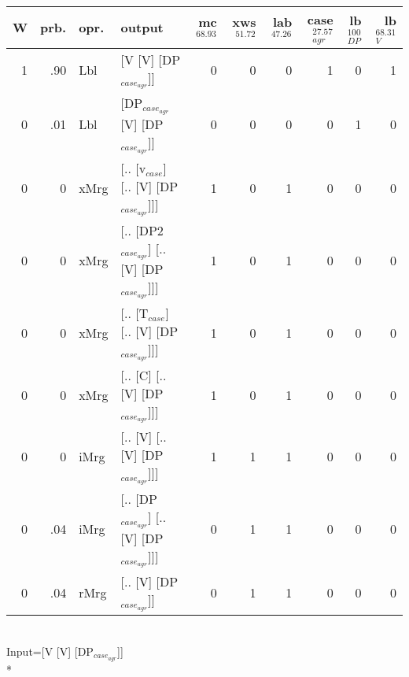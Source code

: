 \begin{tabularx}{\linewidth}{rrlXrrrrrr}
\hline
   W &   prb. & opr.   & output                                     &   mc$^{68.93}$ &   xws$^{51.72}$ &   lab$^{47.26}$ &   case$_{agr}^{27.57}$ &   lb$_{DP}^{100}$ &   lb$_{V}^{68.31}$ \\
\hline
   1 &   .90 & Lbl  & [V [V] [DP$_{case_{agr}}$]]                      &            0 &             0 &             0 &                  1 &                0 &              1 \\
   0 &   .01 & Lbl  & [DP$_{case_{agr}}$ [V] [DP$_{case_{agr}}$]]            &            0 &             0 &             0 &                  0 &                1 &              0 \\
   0 &   0 & xMrg & [.. [v$_{case}$] [.. [V] [DP$_{case_{agr}}$]]]       &            1 &             0 &             1 &                  0 &                0 &              0 \\
   0 &   0 & xMrg & [.. [DP2$_{case_{agr}}$] [.. [V] [DP$_{case_{agr}}$]]] &            1 &             0 &             1 &                  0 &                0 &              0 \\
   0 &   0 & xMrg & [.. [T$_{case}$] [.. [V] [DP$_{case_{agr}}$]]]       &            1 &             0 &             1 &                  0 &                0 &              0 \\
   0 &   0 & xMrg & [.. [C] [.. [V] [DP$_{case_{agr}}$]]]            &            1 &             0 &             1 &                  0 &                0 &              0 \\
   0 &   0 & iMrg & [.. [V] [.. [V] [DP$_{case_{agr}}$]]]            &            1 &             1 &             1 &                  0 &                0 &              0 \\
   0 &   .04 & iMrg & [.. [DP$_{case_{agr}}$] [.. [V] [DP$_{case_{agr}}$]]]  &            0 &             1 &             1 &                  0 &                0 &              0 \\
   0 &   .04 & rMrg & [.. [V] [DP$_{case_{agr}}$]]                     &            0 &             1 &             1 &                  0 &                0 &              0 \\
\hline
\end{tabularx}\endgroup\\
\begingroup\scriptsize Input=[V [V] [DP$_{case_{agr}}$]]\\*
